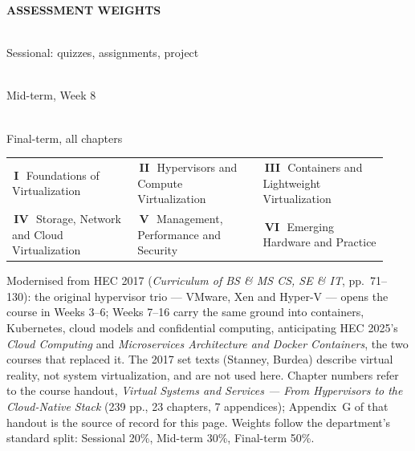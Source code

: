 \documentclass[10pt,a4paper]{article}
\makeatletter
\newcommand{\chipw}[2]{{\setlength{\fboxsep}{1.3pt}\colorbox{#1}{%
  \fontsize{6.4}{7}\selectfont\bfseries\color{white}\,#2\,}}}
\newcommand{\tile}[3]{{\colorbox{lightbg}{\parbox[c][0.9cm][c]{\dimexpr(\linewidth-3pt*\numexpr#1-1\relax)/#1-6pt-0.5pt\relax}{%
  \centering{\large\bfseries\color{primary}#2}\\[-0.5pt]{\fontsize{6.6}{7.4}\selectfont\color{sub}#3}}}}}
\newcommand{\legend}[6]{{\fontsize{6.6}{8}\selectfont\color{sub}%
  \begin{tabular}{@{}p{0.31\linewidth}p{0.31\linewidth}p{0.31\linewidth}@{}}
  \chipw{p1}{I}\ #1 & \chipw{p2}{II}\ #2 & \chipw{p3}{III}\ #3 \\[1pt]
  \chipw{p4}{IV}\ #4 & \chipw{p5}{V}\ #5 & \chipw{p6}{VI}\ #6
  \end{tabular}}}
\makeatother
\begin{document}
\vspace{4pt}
{\fontsize{6.6}{8}\selectfont\bfseries\color{neutral}\MakeUppercase{Assessment weights}}\\[2pt]
\tile{3}{20\%}{Sessional: quizzes, assignments, project}\hfill
\tile{3}{30\%}{Mid-term, Week 8}\hfill
\tile{3}{50\%}{Final-term, all chapters}

\vspace{3pt}
\legend{Foundations of Virtualization}{Hypervisors and Compute Virtualization}{Containers and Lightweight Virtualization}
       {Storage, Network and Cloud Virtualization}{Management, Performance and Security}{Emerging Hardware and Practice}

\vspace{1pt}
{\fontsize{6.3}{7.6}\selectfont\color{neutral}%
Modernised from HEC 2017 (\emph{Curriculum of BS \& MS CS, SE \& IT}, pp.\ 71--130): the original hypervisor trio --- VMware, Xen and Hyper-V --- opens the course in Weeks 3--6; Weeks 7--16 carry the same ground into containers, Kubernetes, cloud models and confidential computing, anticipating HEC 2025's \emph{Cloud Computing} and \emph{Microservices Architecture and Docker Containers}, the two courses that replaced it. The 2017 set texts (Stanney, Burdea) describe virtual reality, not system virtualization, and are not used here. Chapter numbers refer to the course handout, \emph{Virtual Systems and Services --- From Hypervisors to the Cloud-Native Stack} (239 pp., 23 chapters, 7 appendices); Appendix~G of that handout is the source of record for this page.
Weights follow the department's standard split: Sessional 20\%, Mid-term 30\%, Final-term 50\%.\par}
\end{document}
